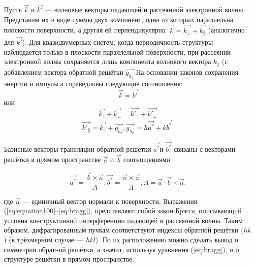 Пусть $\overrightarrow{k}$ и $\overrightarrow{k'}$ — волновые векторы падающей и рассеянной электронной волны. Представим их в виде суммы двух компонент, одна из которых параллельна плоскости поверхности, а другая ей перпендикулярна: $\overrightarrow{k}=\overrightarrow{k_\perp}+\overrightarrow{k_\parallel}$ (аналогично для $\overrightarrow{k'}$). Для квазидвумерных систем, когда периодичность структуры наблюдается только в плоскости параллельной поверхности, при рассеянии электронной волны сохраняется лишь компонента волнового вектора $k_\parallel$ (с добавлением вектора обратной решётки $\overrightarrow{g_{h_k}}$.На основании законов сохранения энергии и импульса справедливы следующие соотношения:
 	\begin{equation}
  \label{eq:equation100}
\overrightarrow{k}=\overrightarrow{k'}
\end{equation}
или
 	\begin{equation}
  \label{eq:equation1}
\overrightarrow{k_\parallel}+\overrightarrow{k_\perp}=\overrightarrow{k'_\parallel}+\overrightarrow{k'_\perp}
\end{equation}
 	\begin{equation}
  \label{eq:bragg}
\overrightarrow{k'_\parallel}=\overrightarrow{k_\parallel}+\overrightarrow{g_{h_k}},  \overrightarrow{g_{h_k}}=h\overrightarrow{a^*}+k\overrightarrow{b^*}.
\end{equation}


Базисные векторы трансляции обратной решётки $\overrightarrow{a^*}$и $\overrightarrow{b^*}$ связаны с векторами решётки в прямом пространстве $\overrightarrow{a}$ и $\overrightarrow{b}$ соотношениями

 	\begin{equation}
  \label{eq:equation1}
\overrightarrow{a^*}=\frac{\overrightarrow{b}\times\overrightarrow{n}}{A},  \overrightarrow{b^*}=\frac{\overrightarrow{n}\times\overrightarrow{a}}{A},  A=\overrightarrow{a}\cdot\overrightarrow{b}\times\overrightarrow{n}.
\end{equation}

где $\overrightarrow{n}$ — единичный вектор нормали к поверхности.
Выражения (\ref{eq:equation100}–\ref{eq:bragg}), представляют собой закон Брэгга,
описывающий условия конструктивной интерференции падающей и рассеянной волны. Таким образом, дифрагированным пучкам соответствуют индексы обратной решётки ($hk$) (в трёхмерном случае — $hkl$). По их расположению можно сделать вывод о симметрии обратной решётки, а значит, используя уравнения (\ref{eq:bragg}), и о структуре решётки в прямом пространстве.
